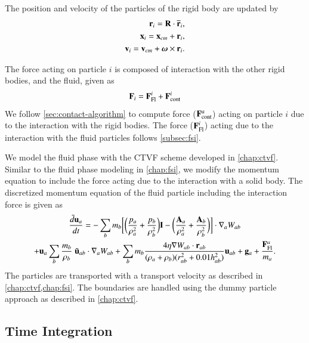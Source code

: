 The position and velocity of the particles of the rigid body are updated by
\begin{eqnarray}
  \label{eq:rfc:rb_particle_pos_update}
  \mathbf{r}_i = \mathbf{R} \cdot \overline{\mathbf{r}}_{i},\\
  \mathbf{x}_i = \mathbf{x}_{cm} + \mathbf{r}_{i},\\
  \mathbf{v}_i = \mathbf{v}_{cm} + \boldsymbol{\omega} \times \mathbf{r}_{i}.
\end{eqnarray}

The force acting on particle $i$ is composed of interaction with the other rigid
bodies, and the fluid, given as
\begin{eqnarray}
  \label{eq:rfc:rb_particle_pos_update}
  \mathbf{F}_i = \mathbf{F}_{\text{Fl}}^i + \mathbf{F}_{\text{cont}}^i
\end{eqnarray}
We follow \cref{sec:contact-algorithm} to compute force
($\mathbf{F}_{\text{cont}}^a$) acting on particle $i$ due to the interaction with
the rigid bodies. The force ($\mathbf{F}_{\text{Fl}}^i$) acting due to the
interaction with the fluid particles follows \cref{subsec:fsi}.

We model the fluid phase with the CTVF \citep{adepu2021corrected} scheme
developed in \cref{chap:ctvf}. Similar to the fluid phase modeling in
\cref{chap:fsi}, we modify the momentum equation to include the force acting due
to the interaction with a solid body. The discretized momentum equation of the
fluid particle including the interaction force is given as
\begin{multline}
  \label{eq:rfc:sph-momentum-fluid}
  \frac{\tilde{d}\mathbf{u}_{a}}{dt} = - \sum_{b} m_b \bigg[
  \bigg(\frac{p_a}{\rho_a^2} + \frac{p_b}{\rho_b^2}\bigg) \mathbf{I} -
  \bigg(\frac{\mathbf{A}_a}{\rho_a^2} + \frac{\mathbf{A}_b}{\rho_b^2}
  \bigg) \bigg]
  \cdot \nabla_{a} W_{ab} \\
  + \mathbf{u}_{a} \sum_{b} \frac{m_b}{\rho_{b}} \; \tilde{\mathbf{u}}_{ab} \cdot
  \nabla_{a} W_{ab} + \sum_{b} m_b \frac{4 \eta \nabla W_{ab}\cdot
    \mathbf{r}_{ab}}{(\rho_a + \rho_b) (r_{ab}^2 + 0.01 h_{ab}^2)} \mathbf{u}_{ab} +
  \mathbf{g}_{a} + \frac{\mathbf{F}^a_{\text{Fl}}}{m_a}.
\end{multline}
The particles are transported with a transport velocity as described in
\cref{chap:ctvf,chap:fsi}. The boundaries are handled using the dummy particle
approach as described in \cref{chap:ctvf}.

\subsection{Time Integration}

